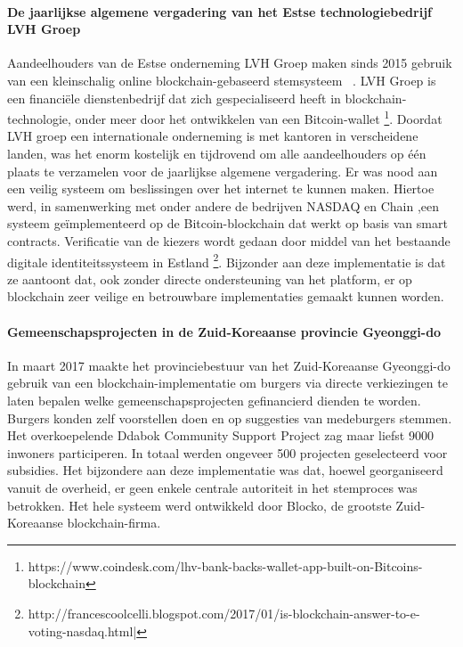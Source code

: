				\paragraph{De jaarlijkse algemene vergadering van het Estse technologiebedrijf LVH Groep}
				Aandeelhouders van de Estse onderneming LVH Groep maken sinds 2015 gebruik van een kleinschalig online blockchain-gebaseerd stemsysteem ~\autocite{Kshetri2018}. LVH Groep is een financiële dienstenbedrijf dat zich gespecialiseerd heeft in blockchain-technologie, onder meer door het ontwikkelen van een Bitcoin-wallet \footnote{https://www.coindesk.com/lhv-bank-backs-wallet-app-built-on-Bitcoins-blockchain}. Doordat LVH groep een internationale onderneming is met kantoren in verscheidene landen, was het enorm kostelijk en tijdrovend om alle aandeelhouders op één plaats te verzamelen voor de jaarlijkse algemene vergadering. Er was  nood aan een veilig systeem om beslissingen over het internet te kunnen maken. Hiertoe werd, in samenwerking met onder andere de bedrijven NASDAQ en Chain ,een systeem geïmplementeerd op de Bitcoin-blockchain dat werkt op basis van smart contracts. Verificatie van de kiezers wordt gedaan door middel van het bestaande digitale identiteitssysteem in Estland \footnote{http://francescoolcelli.blogspot.com/2017/01/is-blockchain-answer-to-e-voting-nasdaq.html|}. Bijzonder aan deze implementatie is dat ze aantoont dat, ook zonder directe ondersteuning van het platform, er op blockchain zeer veilige en betrouwbare implementaties gemaakt kunnen worden. ~\autocite{Kshetri2018}
				
				\paragraph{Gemeenschapsprojecten in de Zuid-Koreaanse provincie Gyeonggi-do}
				In maart 2017 maakte het provinciebestuur van het Zuid-Koreaanse Gyeonggi-do gebruik van een blockchain-implementatie om burgers via directe verkiezingen te laten  bepalen welke gemeenschapsprojecten gefinancierd dienden te worden. Burgers konden zelf voorstellen doen en op suggesties van medeburgers stemmen. Het overkoepelende Ddabok Community Support Project zag maar liefst 9000 inwoners participeren. In totaal werden ongeveer 500  projecten geselecteerd voor subsidies. Het bijzondere aan deze implementatie was dat, hoewel georganiseerd vanuit de overheid, er geen enkele centrale autoriteit in het stemproces was betrokken. Het hele systeem werd ontwikkeld door Blocko, de grootste Zuid-Koreaanse blockchain-firma. ~\autocite{Kshetri2018}
				
